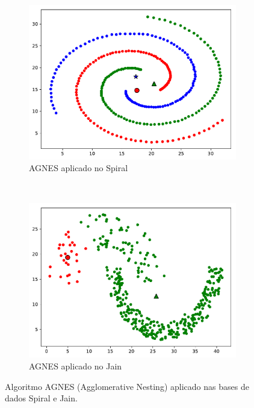 \documentclass{article}
\begin{document}
\begin{figure}[h!]
	\centering
	\begin{subfigure}[t]{0.49\textwidth}
		\centering
		\includegraphics[width=\linewidth]{exercicio7-agnes-spiral.pdf}
		\caption{AGNES aplicado no Spiral}
		\label{fig:exercicio7-agnes-spiral}
	\end{subfigure}%
	~ 
	\begin{subfigure}[t]{0.49\textwidth}
		\centering
		\includegraphics[width=\linewidth]{exercicio7-agnes-jain.pdf}
		\caption{AGNES aplicado no Jain}
		\label{fig:exercicio7-agnes-jain}
	\end{subfigure}
	\label{fig:exercicio7-agnes}
	\caption{Algoritmo AGNES (Agglomerative Nesting) aplicado nas bases de dados Spiral e Jain.}
\end{figure}
\end{document}

